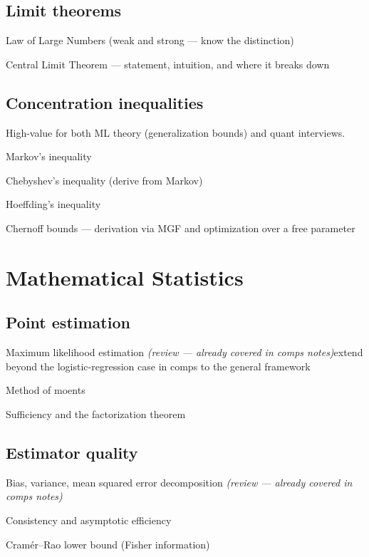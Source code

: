 \documentclass[11pt]{article}
\newcommand{\review}{\textit{(review — already covered in comps notes)}}
\newcommand{\note}[1]{\textcolor{gray!70!black}{\small #1}}
\begin{document}
\subsection{Limit theorems}
\begin{tasklist}
    \item Law of Large Numbers (weak and strong — know the distinction)
    \item Central Limit Theorem — statement, intuition, and where it breaks down
\end{tasklist}

\subsection{Concentration inequalities}
\note{High-value for both ML theory (generalization bounds) and quant interviews.}
\begin{tasklist}
    \item Markov's inequality
    \item Chebyshev's inequality (derive from Markov)
    \item Hoeffding's inequality
    \item Chernoff bounds — derivation via MGF and optimization over a free parameter
\end{tasklist}

\section{Mathematical Statistics}

\subsection{Point estimation}
\begin{tasklist}
    \item Maximum likelihood estimation \review \note{extend beyond the logistic-regression case in comps to the general framework}
    \item Method of moents
    \item Sufficiency and the factorization theorem
\end{tasklist}

\subsection{Estimator quality}
\begin{tasklist}
    \item Bias, variance, mean squared error decomposition \review
    \item Consistency and asymptotic efficiency
    \item Cramér--Rao lower bound (Fisher information)
\end{tasklist}
\end{document}
